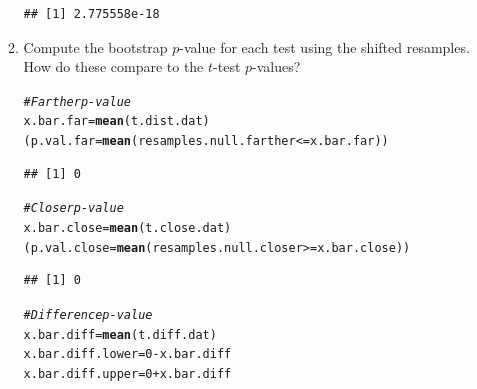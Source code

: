 \documentclass{article}\usepackage[]{graphicx}\usepackage[]{xcolor}
\makeatletter
\newcommand{\hlnum}[1]{\textcolor[rgb]{0.686,0.059,0.569}{#1}}%
\newcommand{\hlcom}[1]{\textcolor[rgb]{0.678,0.584,0.686}{\textit{#1}}}%
\newcommand{\hlopt}[1]{\textcolor[rgb]{0,0,0}{#1}}%
\newcommand{\hldef}[1]{\textcolor[rgb]{0.345,0.345,0.345}{#1}}%
\newcommand{\hlkwb}[1]{\textcolor[rgb]{0.69,0.353,0.396}{#1}}%
\newcommand{\hlkwd}[1]{\textcolor[rgb]{0.737,0.353,0.396}{\textbf{#1}}}%
\newenvironment{kframe}{%
 \def\at@end@of@kframe{}%
 \ifinner\ifhmode%
  \def\at@end@of@kframe{\end{minipage}}%
  \begin{minipage}{\columnwidth}%
 \fi\fi%
 \def\FrameCommand##1{\hskip\@totalleftmargin \hskip-\fboxsep
 \colorbox{shadecolor}{##1}\hskip-\fboxsep
     \hskip-\linewidth \hskip-\@totalleftmargin \hskip\columnwidth}%
 \MakeFramed {\advance\hsize-\width
   \@totalleftmargin\z@ \linewidth\hsize
   \@setminipage}}%
 {\par\unskip\endMakeFramed%
 \at@end@of@kframe}
\newenvironment{knitrout}{}{} %
\makeatother
\begin{document}
\begin{enumerate}
\begin{enumerate}
\begin{knitrout}
\begin{kframe}
\begin{verbatim}
## [1] 2.775558e-18
\end{verbatim}
\end{kframe}
\end{knitrout}
  \item Compute the bootstrap $p$-value for each test using the shifted resamples. 
  How do these compare to the $t$-test $p$-values?
\begin{knitrout}\scriptsize
{}\color{fgcolor}\begin{kframe}
\begin{alltt}
\hlcom{#Farther p-value}
\hldef{x.bar.far} \hlkwb{=} \hlkwd{mean}\hldef{(t.dist.dat)}
\hldef{(p.val.far} \hlkwb{=} \hlkwd{mean}\hldef{(resamples.null.farther} \hlopt{<=} \hldef{x.bar.far))}
\end{alltt}
\begin{verbatim}
## [1] 0
\end{verbatim}
\begin{alltt}
\hlcom{#Closer p-value}
\hldef{x.bar.close} \hlkwb{=} \hlkwd{mean}\hldef{(t.close.dat)}
\hldef{(p.val.close} \hlkwb{=} \hlkwd{mean}\hldef{(resamples.null.closer} \hlopt{>=}\hldef{x.bar.close))}
\end{alltt}
\begin{verbatim}
## [1] 0
\end{verbatim}
\begin{alltt}
\hlcom{#Difference p-value}
\hldef{x.bar.diff} \hlkwb{=} \hlkwd{mean}\hldef{(t.diff.dat)}
\hldef{x.bar.diff.lower} \hlkwb{=} \hlnum{0}\hlopt{-}\hldef{x.bar.diff}
\hldef{x.bar.diff.upper} \hlkwb{=} \hlnum{0}\hlopt{+}\hldef{x.bar.diff}


\end{alltt}
\end{kframe}
\end{knitrout}
\end{enumerate}
\end{enumerate}
\end{document}
